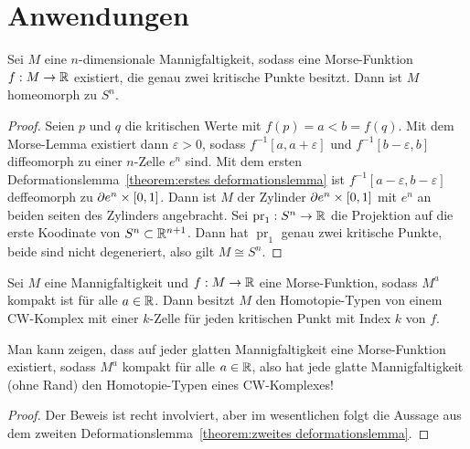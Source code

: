 \section{Anwendungen}

\begin{theorem}
    \label{theorem:Sn}
    Sei $M$ eine $n$-dimensionale Mannigfaltigkeit, sodass eine Morse-Funktion
    $f: M \to { \mathbb R }$ existiert, die genau zwei kritische Punkte besitzt.
    Dann ist $M$ homeomorph zu $S^n$.
\end{theorem}

\begin{proof}
    Seien $p$ und $q$ die kritischen Werte mit $f(p) = a < b = f(q)$. Mit dem 
    Morse-Lemma existiert dann $\varepsilon > 0$, sodass 
    $f^{-1}[a, a + \varepsilon]$ und $f^{-1}[b - \varepsilon, b]$ diffeomorph
    zu einer $n$-Zelle $e^n$ sind. 
    Mit dem ersten Deformationslemma~\ref{theorem:erstes deformationslemma} ist
    $f^{-1}[a - \varepsilon, b - \varepsilon]$ deffeomorph zu 
    ${ \partial } e^n \times [0, 1]$. Dann ist $M$ der Zylinder ${ \partial } e^n \times [0, 1]$ 
    mit $e^n$ an beiden seiten des Zylinders angebracht. Sei 
    $\operatorname{pr}_1: S^n \to { \mathbb R }$ die Projektion auf die erste Koodinate von
    $S^n \subset { \mathbb R }^{n + 1}$. Dann hat $\operatorname{pr}_1$ genau zwei kritische 
    Punkte, beide sind nicht degeneriert, also gilt $M \cong S^n$.
\end{proof}

\begin{theorem}
    \label{theorem:CW-komplex}
    Sei $M$ eine Mannigfaltigkeit und $f: M \to { \mathbb R }$ eine Morse-Funktion, sodass
    $M^a$ kompakt ist für alle $a \in { \mathbb R }$. 
    Dann besitzt $M$ den Homotopie-Typen von einem CW-Komplex mit einer $k$-Zelle 
    für jeden kritischen Punkt mit Index $k$ von $f$.
\end{theorem}

\begin{remark}
    Man kann zeigen, dass auf jeder glatten Mannigfaltigkeit eine Morse-Funktion
    existiert, sodass $M^a$ kompakt für alle $a \in { \mathbb R }$, also hat jede glatte 
    Mannigfaltigkeit (ohne Rand) den Homotopie-Typen eines CW-Komplexes!
\end{remark}

\begin{proof}
    Der Beweis ist recht involviert, aber im wesentlichen folgt die Aussage aus
    dem zweiten Deformationslemma~\ref{theorem:zweites deformationslemma}.
\end{proof}

